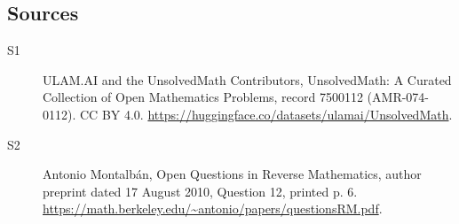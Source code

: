 \documentclass[11pt]{article}
\begin{document}
\subsection{Sources}
\begin{description}
\item[\hypertarget{source:7500112:1}{S1}] ULAM.AI and the UnsolvedMath Contributors, UnsolvedMath: A Curated Collection of Open Mathematics Problems, record 7500112 (AMR-074-0112). CC BY 4.0. \url{https://huggingface.co/datasets/ulamai/UnsolvedMath}.
\item[\hypertarget{source:7500112:2}{S2}] Antonio Montalbán, Open Questions in Reverse Mathematics, author preprint dated 17 August 2010, Question 12, printed p. 6. \url{https://math.berkeley.edu/~antonio/papers/questionsRM.pdf}.
\end{description}
\label{end:7500112}
\end{document}

